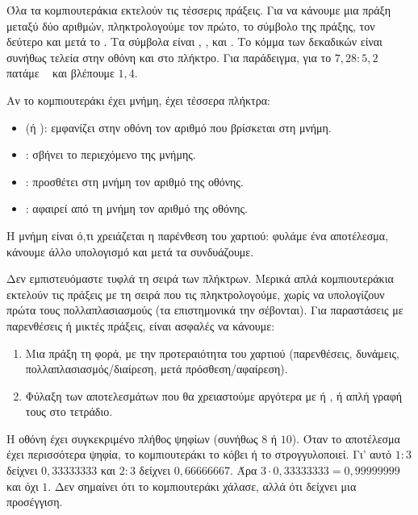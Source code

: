 

Όλα τα κομπιουτεράκια εκτελούν τις τέσσερις πράξεις. Για να κάνουμε μια πράξη μεταξύ δύο αριθμών, πληκτρολογούμε τον πρώτο, το σύμβολο της πράξης, τον δεύτερο και μετά το \key{$=$}. Τα σύμβολα είναι \kpl, \kmi, \kpo{} και \kdi. Το κόμμα των δεκαδικών είναι συνήθως τελεία στην οθόνη και στο πλήκτρο. Για παράδειγμα, για το $7{,}28:5{,}2$ πατάμε  \kdi\  \kis{} και βλέπουμε $1{,}4$.


Αν το κομπιουτεράκι έχει μνήμη, έχει τέσσερα πλήκτρα:
\begin{itemize}[leftmargin=1.2em,itemsep=0.3ex,topsep=2pt]
\item {} (ή ): εμφανίζει στην οθόνη τον αριθμό που βρίσκεται στη μνήμη.
\item {}: σβήνει το περιεχόμενο της μνήμης.
\item {}: προσθέτει στη μνήμη τον αριθμό της οθόνης.
\item {}: αφαιρεί από τη μνήμη τον αριθμό της οθόνης.
\end{itemize}
Η μνήμη είναι ό,τι χρειάζεται η παρένθεση του χαρτιού: φυλάμε ένα αποτέλεσμα, κάνουμε άλλο υπολογισμό και μετά τα συνδυάζουμε.


Δεν εμπιστευόμαστε τυφλά τη σειρά των πλήκτρων. Μερικά απλά κομπιουτεράκια εκτελούν τις πράξεις με τη σειρά που τις πληκτρολογούμε, χωρίς να υπολογίζουν πρώτα τους πολλαπλασιασμούς (τα επιστημονικά την σέβονται). Για παραστάσεις με παρενθέσεις ή μικτές πράξεις, είναι ασφαλές να κάνουμε:
\begin{enumerate}[leftmargin=1.6em,itemsep=0.3ex,topsep=2pt]
\item Μια πράξη τη φορά, με την προτεραιότητα του χαρτιού (παρενθέσεις, δυνάμεις, πολλαπλασιασμός/διαίρεση, μετά πρόσθεση/αφαίρεση).
\item Φύλαξη των αποτελεσμάτων που θα χρειαστούμε αργότερα με  ή , ή απλή γραφή τους στο τετράδιο.
\end{enumerate}


Η οθόνη έχει συγκεκριμένο πλήθος ψηφίων (συνήθως $8$ ή $10$). Όταν το αποτέλεσμα έχει περισσότερα ψηφία, το κομπιουτεράκι το κόβει ή το στρογγυλοποιεί. Γι' αυτό $1:3$ δείχνει $0{,}33333333$ και $2:3$ δείχνει $0{,}66666667$. Άρα $3\cdot0{,}33333333=0{,}99999999$ και όχι $1$. Δεν σημαίνει ότι το κομπιουτεράκι χάλασε, αλλά ότι δείχνει μια προσέγγιση.


